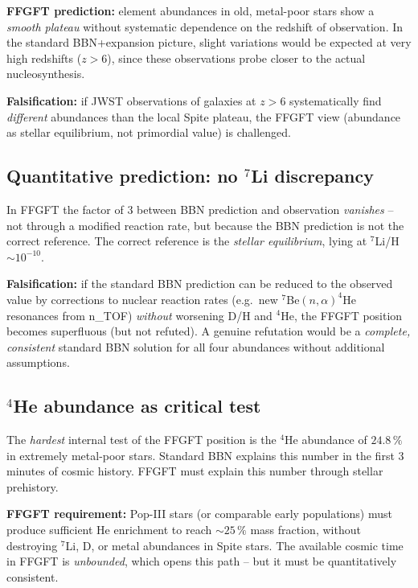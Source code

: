 \textbf{FFGFT prediction:} element abundances in old, metal-poor
stars show a \emph{smooth plateau} without systematic dependence on
the redshift of observation. In the standard BBN+expansion picture,
slight variations would be expected at very high redshifts ($z > 6$),
since these observations probe closer to the actual nucleosynthesis.

\textbf{Falsification:} if JWST observations of galaxies at $z > 6$
systematically find \emph{different} abundances than the local Spite
plateau, the FFGFT view (abundance as stellar equilibrium, not
primordial value) is challenged.

\subsection{\texorpdfstring{Quantitative prediction: no $^7$Li discrepancy}{Quantitative prediction: no 7Li discrepancy}}

In FFGFT the factor of $3$ between BBN prediction and observation
\emph{vanishes} -- not through a modified reaction rate, but because
the BBN prediction is not the correct reference. The correct
reference is the \emph{stellar equilibrium}, lying at $^7$Li/H $\sim
10^{-10}$.

\textbf{Falsification:} if the standard BBN prediction can be
reduced to the observed value by corrections to nuclear reaction
rates (e.g.\ new $^7$Be$(n,\alpha)^4$He resonances from n\_TOF)
\emph{without} worsening D/H and $^4$He, the FFGFT position becomes
superfluous (but not refuted). A genuine refutation would be a
\emph{complete, consistent} standard BBN solution for all four
abundances without additional assumptions.

\subsection{\texorpdfstring{$^4$He abundance as critical test}{4He abundance as critical test}}

The \emph{hardest} internal test of the FFGFT position is the $^4$He
abundance of $24.8\,\%$ in extremely metal-poor stars. Standard BBN
explains this number in the first 3 minutes of cosmic history. FFGFT
must explain this number through stellar prehistory.

\textbf{FFGFT requirement:} Pop-III stars (or comparable early
populations) must produce sufficient He enrichment to reach $\sim
25\,\%$ mass fraction, without destroying $^7$Li, D, or metal
abundances in Spite stars. The available cosmic time in FFGFT is
\emph{unbounded}, which opens this path -- but it must be
quantitatively consistent.

